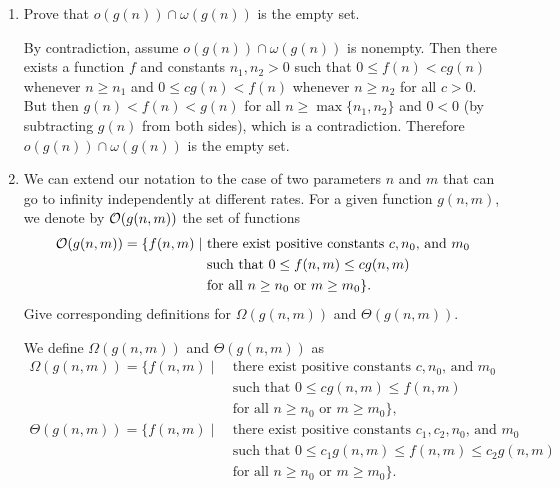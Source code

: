 \documentclass[Chapter03]{subfiles}
\begin{document}
\begin{enumerate}[leftmargin=\labelsep]
		\item Prove that $o(g(n)) \cap \omega(g(n))$ is the empty set.
		\begin{answer}
			By contradiction, assume $o(g(n)) \cap \omega(g(n))$ is nonempty. Then there exists a function $f$ and constants $n_1,n_2 > 0$ such that $0 \leq f(n) < cg(n)$ whenever $n \geq n_1$ and $0 \leq cg(n) < f(n)$ whenever $n \geq n_2$ for all $c > 0$. But then $g(n) < f(n) < g(n)$ for all $n \geq \max\{n_1,n_2\}$ and $0 < 0$ (by subtracting $g(n)$ from both sides), which is a contradiction. Therefore $o(g(n)) \cap \omega(g(n))$ is the empty set.
		\end{answer}

		\item We can extend our notation to the case of two parameters $n$ and $m$ that can go to infinity independently at different rates. For a given function $g(n,m)$, we denote by $\mathcal{O}(g(n,m))$ the set of functions
		\begin{align*}
			\mathcal{O}(g(n,m)) = \{ f(n,m) \mid\ &\text{there exist positive constants $c, n_0$, and $m_0$}\\
				&\text{such that $0 \leq f(n,m) \leq cg(n,m)$}\\
				&\text{for all $n \geq n_0$ or $m \geq m_0$}\}.
		\end{align*}
		Give corresponding definitions for $\Omega(g(n,m))$ and $\Theta(g(n,m))$.
		\begin{answer}
			We define $\Omega(g(n,m))$ and $\Theta(g(n,m))$ as
			\begin{align*}
				\Omega(g(n,m)) = \{ f(n,m) \mid\ &\text{there exist positive constants $c, n_0$, and $m_0$}\\
					&\text{such that $0 \leq cg(n,m) \leq f(n,m)$}\\
					&\text{for all $n \geq n_0$ or $m \geq m_0$}\},\\
				\Theta(g(n,m)) = \{ f(n,m) \mid\ &\text{there exist positive constants $c_1, c_2, n_0$, and $m_0$}\\
					&\text{such that $0 \leq c_1g(n,m) \leq f(n,m) \leq c_2g(n,m)$}\\
					&\text{for all $n \geq n_0$ or $m \geq m_0$}\}.
			\end{align*}
		\end{answer}

	\end{enumerate}
\end{document}
